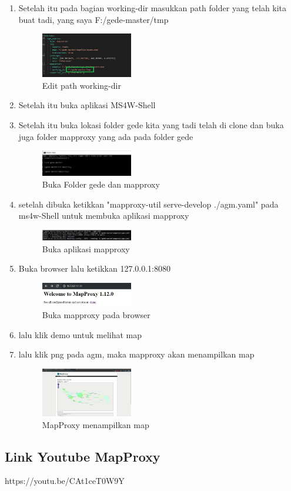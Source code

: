 \begin{enumerate}
  \item Setelah itu pada bagian working-dir masukkan path folder yang telah kita buat tadi, yang saya F:/gede-master/tmp
  \hfill\break
  \begin{figure}[H]
  \includegraphics[width=4cm]{figures/tugas4/1174053/29.png}
  \centering
  \caption{Edit path working-dir}
  \end{figure}

  \item Setelah itu buka aplikasi MS4W-Shell

  \item Setelah itu buka lokasi folder gede kita yang tadi telah di clone dan buka juga folder mapproxy yang ada pada folder gede
  \hfill\break
  \begin{figure}[H]
  \includegraphics[width=4cm]{figures/tugas4/1174053/30.png}
  \centering
  \caption{Buka Folder gede dan mapproxy}
  \end{figure}

  \item setelah dibuka ketikkan "mapproxy-util serve-develop ./agm.yaml" pada ms4w-Shell untuk membuka aplikasi mapproxy
  \hfill\break
  \begin{figure}[H]
  \includegraphics[width=4cm]{figures/tugas4/1174053/31.png}
  \centering
  \caption{Buka aplikasi mapproxy}
  \end{figure}
  
  \item Buka browser lalu ketikkan 127.0.0.1:8080
  \hfill\break
  \begin{figure}[H]
  \includegraphics[width=4cm]{figures/tugas4/1174053/32.png}
  \centering
  \caption{Buka mapproxy pada browser}
  \end{figure}

  \item lalu klik demo untuk melihat map
  \item lalu klik png pada agm, maka mapproxy akan menampilkan map
  \hfill\break
  \begin{figure}[H]
  \includegraphics[width=4cm]{figures/tugas4/1174053/33.png}
  \centering
  \caption{MapProxy menampilkan map}
  \end{figure}

\end{enumerate}
\subsection{Link Youtube MapProxy}
https://youtu.be/CAt1ceT0W9Y